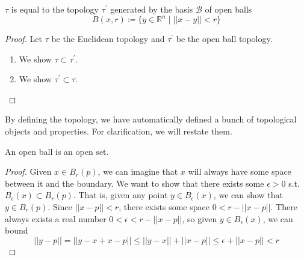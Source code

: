       \begin{theorem}
        $\tau$ is equal to the topology $\tau^\prime$ generated by the basis $\mathscr{B}$ of open balls 
        \begin{equation} 
          B(x, r) \coloneqq \{ y \in \mathbb{R}^n \mid ||x - y|| < r\}
        \end{equation}
      \end{theorem} 
      \begin{proof}
        Let $\tau$ be the Euclidean topology and $\tau^\prime$ be the open ball topology. 
        \begin{enumerate}
          \item We show $\tau \subset \tau^\prime$. 
          \item We show $\tau^\prime \subset \tau$. 
        \end{enumerate}
      \end{proof} 

      By defining the topology, we have automatically defined a bunch of topological objects and properties. For clarification, we will restate them. 
      
      \begin{corollary}
        An open ball is an open set. 
      \end{corollary}
      \begin{proof}
        Given $x \in B_r (p)$, we can imagine that $x$ will always have some space between it and the boundary. We want to show that there exists some $\epsilon >0$ s.t. $B_\epsilon (x) \subset B_r (p)$. That is, given any point $y \in B_\epsilon (x)$, we can show that $y \in B_r (p)$. Since $||x - p|| < r$, there exists some space $0 < r - ||x - p||$. There always exists a real number $0 < \epsilon < r - ||x - p||$, so given $y \in B_\epsilon (x)$, we can bound
        \begin{equation}
          ||y - p|| = ||y - x + x - p|| \leq ||y - x|| + ||x - p|| \leq \epsilon + ||x - p|| < r
        \end{equation}
      \end{proof}

